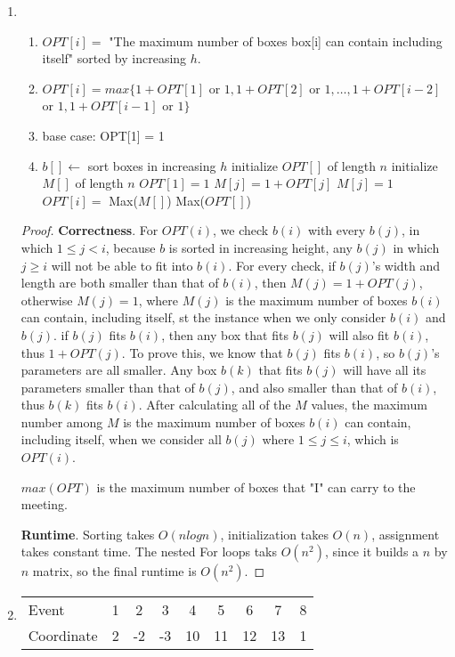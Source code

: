 \documentclass[paper=a4, fontsize=11pt]{scrartcl} %
\numberwithin{equation}{section} %
\numberwithin{figure}{section} %
\numberwithin{table}{section} %
\newenvironment{myproof}{\begin{proof}\setlength{\parindent}{2em}}{\end{proof}}
\begin{document}
\begin{enumerate}
\item %
\begin{enumerate}
\item 
$OPT[i] = $ "The maximum number of boxes box[i] can contain including itself" sorted by increasing $h$.
\item
$OPT[i] = max\{ 1+OPT[1]$ or $1, 1+OPT[2]$ or $1, \ldots, 1+OPT[i-2]$ or $1, 1+OPT[i-1]$ or $1\}$
\item
base case: OPT[1] = 1
\item
\begin{algorithmic}
\STATE $b[]\leftarrow$ sort boxes in increasing $h$
\STATE initialize $OPT[]$ of length $n$
\STATE initialize $M[]$ of length $n$
\STATE $OPT[1]=1$
			\STATE $M[j]=1+OPT[j]$
		\ELSE
			\STATE $M[j]=1$
		\ENDIF
	\ENDFOR
	\STATE $OPT[i] = $ Max($M[]$)
\ENDFOR
\RETURN Max($OPT[]$)
\end{algorithmic}
\end{enumerate}
\begin{myproof}
\textbf{Correctness}. 
For $OPT(i)$, we check $b(i)$ with every $b(j)$, in which $1\leq j < i$, because $b$ is sorted in increasing height, any $b(j)$ in which $j\geq i$ will not be able to fit into $b(i)$. For every check, if $b(j)$'s width and length are both smaller than that of $b(i)$, then $M(j) = 1 + OPT(j)$, otherwise $M(j) = 1$, where $M(j)$ is the maximum number of boxes $b(i)$ can contain, including itself, st the instance when we only consider $b(i)$ and $b(j)$. if $b(j)$ fits $b(i)$, then any box that fits $b(j)$ will also fit $b(i)$, thus $1 + OPT(j)$. To prove this, we know that $b(j)$ fits $b(i)$, so $b(j)$'s parameters are all smaller. Any box $b(k)$ that fits $b(j)$ will have all its parameters smaller than that of $b(j)$, and also smaller than that of $b(i)$, thus $b(k)$ fits $b(i)$. After calculating all of the $M$ values, the maximum number among $M$ is the maximum number of boxes $b(i)$ can contain, including itself, when we consider all $b(j)$ where $1 \leq  j \leq i$, which is $OPT(i)$.


$max(OPT)$ is the maximum number of boxes that "I" can carry to the meeting.

\textbf{Runtime}.   Sorting takes $O(nlogn)$, initialization takes $O(n)$, assignment takes constant time. The nested For loops taks $O(n^2)$, since it builds a $n$ by $n$ matrix, so the final runtime is $O(n^2)$. 
\end{myproof}
\item %
\begin{tabular}{l c c c c c c c c}
  \hline                        
  Event&1 & 2 & 3& 4&5&6&7&8\\
  Coordinate&2 & -2 & -3 &10&11&12&13&1\\
  \hline  
\end{tabular}


\end{enumerate}
\end{document}
